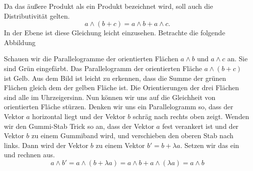 \documentclass[fleqn]{scrartcl}
\numberwithin{equation}{section}
\begin{document}
Da das äußere Produkt als ein Produkt bezeichnet wird, soll auch die
Distributivität gelten.
\[a\wedge (b + c) = a\wedge b + a\wedge c.\]
In der Ebene ist diese Gleichung leicht einzusehen. Betrachte die folgende
Abbildung
\begin{center}
\begin{minipage}{\linewidth}
\centering
{}
\label{fig:distributivity}
\end{minipage}
\end{center}
Schauen wir die Parallelogramme der orientierten Flächen $a\wedge b$ und
$a\wedge c$ an. Sie sind Grün eingefärbt. Das Parallelogramm der orientierten
Fläche $a\wedge (b + c)$ ist Gelb. Aus dem Bild ist leicht zu erkennen, dass
die Summe der grünen Flächen gleich dem der gelben Fläche ist. Die
Orientierungen der drei Flächen sind alle im Uhrzeigersinn.
\newpage
Nun können wir uns auf die Gleichheit von orientierten Fläche stürzen. Denken
wir uns ein Parallelogramm so, dass der Vektor $a$ horizontal liegt und der
Vektor $b$ schräg nach rechts oben zeigt. Wenden wir den Gummi-Stab Trick so
an, dass der Vektor $a$ fest verankert ist und der Vektor $b$ zu einem
Gummiband wird, und verschieben den oberen Stab nach links. Dann wird der
Vektor $b$ zu einem Vektor $b'=b+\lambda a$. Setzen wir das ein und rechnen
aus.
\[a\wedge b' = a\wedge (b + \lambda a) = a \wedge b + a\wedge (\lambda a)=
a\wedge b\]
\end{document}
